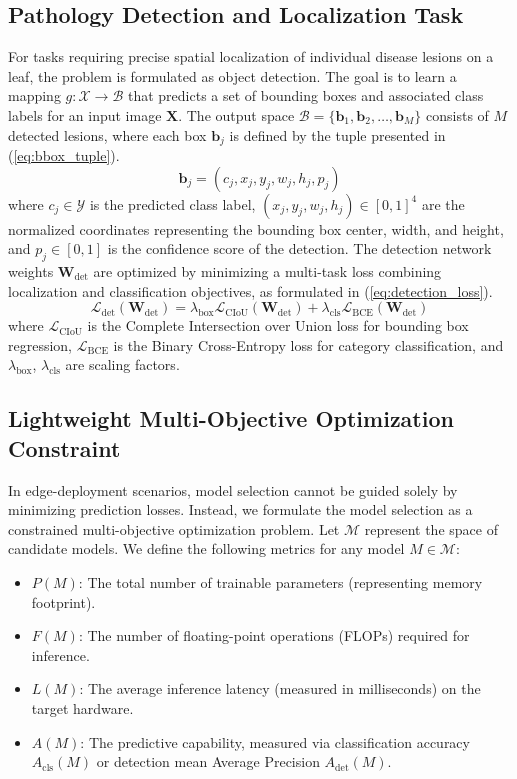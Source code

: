 \documentclass[10pt, conference]{IEEEtran}
\begin{document}
\subsection{Pathology Detection and Localization Task}
For tasks requiring precise spatial localization of individual disease lesions on a leaf, the problem is formulated as object detection. The goal is to learn a mapping $g: \mathcal{X} \to \mathcal{B}$ that predicts a set of bounding boxes and associated class labels for an input image $\mathbf{X}$. The output space $\mathcal{B} = \{\mathbf{b}_1, \mathbf{b}_2, \dots, \mathbf{b}_M\}$ consists of $M$ detected lesions, where each box $\mathbf{b}_j$ is defined by the tuple presented in (\ref{eq:bbox_tuple}).
\begin{equation}
    \label{eq:bbox_tuple}
    \mathbf{b}_j = \left(c_j, x_j, y_j, w_j, h_j, p_j\right)
\end{equation}
where $c_j \in \mathcal{Y}$ is the predicted class label, $(x_j, y_j, w_j, h_j) \in [0, 1]^4$ are the normalized coordinates representing the bounding box center, width, and height, and $p_j \in [0, 1]$ is the confidence score of the detection. The detection network weights $\mathbf{W}_{\text{det}}$ are optimized by minimizing a multi-task loss combining localization and classification objectives, as formulated in (\ref{eq:detection_loss}).
\begin{equation}
    \label{eq:detection_loss}
    \mathcal{L}_{\text{det}}(\mathbf{W}_{\text{det}}) = \lambda_{\text{box}} \mathcal{L}_{\text{CIoU}}(\mathbf{W}_{\text{det}}) + \lambda_{\text{cls}} \mathcal{L}_{\text{BCE}}(\mathbf{W}_{\text{det}})
\end{equation}
where $\mathcal{L}_{\text{CIoU}}$ is the Complete Intersection over Union loss for bounding box regression, $\mathcal{L}_{\text{BCE}}$ is the Binary Cross-Entropy loss for category classification, and $\lambda_{\text{box}}$, $\lambda_{\text{cls}}$ are scaling factors.

\subsection{Lightweight Multi-Objective Optimization Constraint}
In edge-deployment scenarios, model selection cannot be guided solely by minimizing prediction losses. Instead, we formulate the model selection as a constrained multi-objective optimization problem. Let $\mathcal{M}$ represent the space of candidate models. We define the following metrics for any model $M \in \mathcal{M}$:
\begin{itemize}
    \item $P(M)$: The total number of trainable parameters (representing memory footprint).
    \item $F(M)$: The number of floating-point operations (FLOPs) required for inference.
    \item $L(M)$: The average inference latency (measured in milliseconds) on the target hardware.
    \item $A(M)$: The predictive capability, measured via classification accuracy $A_{\text{cls}}(M)$ or detection mean Average Precision $A_{\text{det}}(M)$.
\end{itemize}
\end{document}
